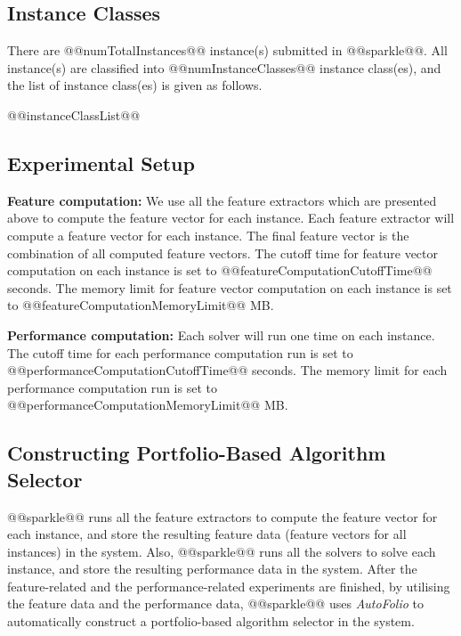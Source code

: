 \documentclass[british]{article}
\begin{document}
\subsection{Instance Classes}
\label{sec:Instance_Classes}
There are @@numTotalInstances@@ instance(s) submitted in @@sparkle@@. All instance(s) are classified into @@numInstanceClasses@@ instance class(es), and the list of instance class(es) is given as follows.

\begin{enumerate}
@@instanceClassList@@
\end{enumerate}

\subsection{Experimental Setup}
\label{sec:Experimental_Setup}

\textbf{Feature computation:} We use all the feature extractors which are presented above to compute the feature vector for each instance. Each feature extractor will compute a feature vector for each instance. The final feature vector is the combination of all computed feature vectors. The cutoff time for feature vector computation on each instance is set to @@featureComputationCutoffTime@@ seconds. The memory limit for feature vector computation on each instance is set to @@featureComputationMemoryLimit@@ MB.

\textbf{Performance computation:} Each solver will run one time on each instance. The cutoff time for each performance computation run is set to @@performanceComputationCutoffTime@@ seconds. The memory limit for each performance computation run is set to @@performanceComputationMemoryLimit@@ MB.

\subsection{Constructing Portfolio-Based Algorithm Selector}
\label{sec:Portfolio}

@@sparkle@@ runs all the feature extractors to compute the feature vector for each instance, and store the resulting feature data (feature vectors for all instances) in the system. Also, @@sparkle@@ runs all the solvers to solve each instance, and store the resulting performance data in the system. After the feature-related and the performance-related experiments are finished, by utilising the feature data and the performance data, @@sparkle@@ uses \emph{AutoFolio} \cite{LinEtAl15} to automatically construct a portfolio-based algorithm selector in the system.
\end{document}

